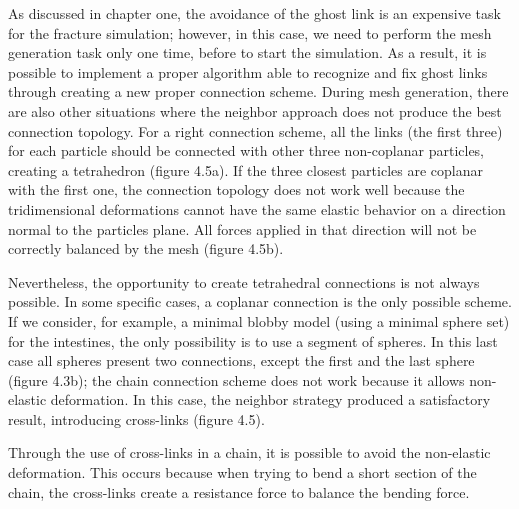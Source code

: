 \documentclass[journal]{vgtc}                %
\begin{document}
As discussed in chapter one, the avoidance of the ghost link is an expensive task for
the fracture simulation; however, in this case, we need to perform the mesh
generation task only one time, before to start the simulation. As a result, it is
possible to implement a proper algorithm able to recognize and fix ghost links
through creating a new proper connection scheme. During mesh generation, there are
also other situations where the neighbor approach does not produce the best
connection topology. For a right connection scheme, all the links (the first three) for
each particle should be connected with other three non-coplanar particles, creating a
tetrahedron (figure 4.5a). If the three closest particles are coplanar with the first one,
the connection topology does not work well because the tridimensional deformations
cannot have the same elastic behavior on a direction normal to the particles plane.
All forces applied in that direction will not be correctly balanced by the mesh (figure
4.5b).

Nevertheless, the opportunity to create tetrahedral connections is not always
possible. In some specific cases, a coplanar connection is the only possible scheme.
If we consider, for example, a minimal blobby model (using a minimal sphere set)
for the intestines, the only possibility is to use a segment of spheres. In this last case
all spheres present two connections, except the first and the last sphere (figure 4.3b);
the chain connection scheme does not work because it allows non-elastic
deformation. In this case, the neighbor strategy produced a satisfactory result,
introducing cross-links (figure 4.5).

Through the use of cross-links in a chain, it is possible to avoid the non-elastic
deformation. This occurs because when trying to bend a short section of the chain,
the cross-links create a resistance force to balance the bending force.
\end{document}
